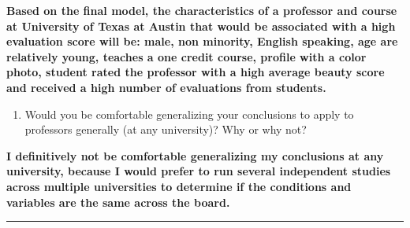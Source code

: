 \documentclass[
]{article}
\providecommand{\tightlist}{%
  \setlength{\itemsep}{0pt}\setlength{\parskip}{0pt}}
\begin{document}
\textbf{Based on the final model, the characteristics of a professor and
course at University of Texas at Austin that would be associated with a
high evaluation score will be: male, non minority, English speaking, age
are relatively young, teaches a one credit course, profile with a color
photo, student rated the professor with a high average beauty score and
received a high number of evaluations from students.}

\begin{enumerate}
\def\labelenumi{\arabic{enumi}.}
\setcounter{enumi}{18}
\tightlist
\item
  Would you be comfortable generalizing your conclusions to apply to
  professors generally (at any university)? Why or why not?
\end{enumerate}

\textbf{I definitively not be comfortable generalizing my conclusions at
any university, because I would prefer to run several independent
studies across multiple universities to determine if the conditions and
variables are the same across the board.}

\begin{center}\rule{0.5\linewidth}{0.5pt}\end{center}
\end{document}

